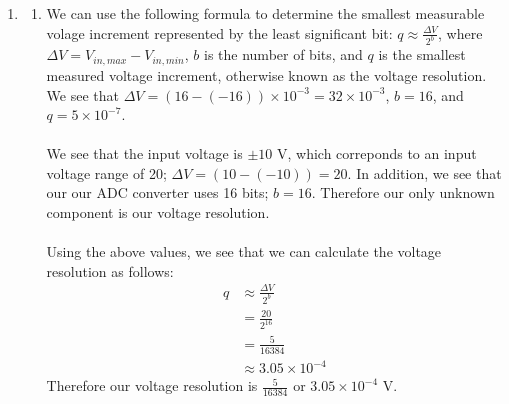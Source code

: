\documentclass[12pt, a4paper]{article}
\begin{document}
\begin{enumerate}
\item
\begin{enumerate}
\item  
 We can use the following formula to determine the smallest measurable volage increment represented by the least significant bit: $ q \approx \frac{\Delta V}{2^b}$, where $\Delta V = V_{in, max} - V_{in, min}$, $b$ is the number of bits, and $q$ is the smallest measured voltage increment, otherwise known as the voltage resolution. We see that $\Delta V = (16 - (-16)) \times 10^{-3} = 32 \times 10^{-3}$, $b = 16$, and $q = 5\times 10^{-7}$. \\ \\
We see that the input voltage is $\pm 10 $ V, which correponds to an input voltage range of 20; $\Delta V = (10 - (-10)) = 20$. In addition, we see that our our ADC converter uses 16 bits; $b = 16$. Therefore our only unknown component is our voltage resolution. \\ \\
Using the above values, we see that we can calculate the voltage resolution as follows: 
\begin{align*}
 q &\approx \frac{\Delta V}{2^b} \\
 &= \frac{20}{2^{16}} \\
&= \frac{5}{16384} \\
&\approx 3.05 \times 10^{-4}
\end{align*}
Therefore our voltage resolution is $\frac{5}{16384}$ or $3.05 \times 10^{-4}$ V.
%



\end{enumerate}
\end{enumerate}
\end{document}
